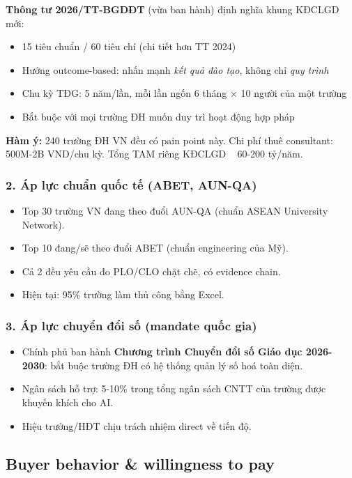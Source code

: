 \documentclass[11pt,a4paper]{article}
\begin{document}
\textbf{Thông tư 2026/TT-BGDĐT} (vừa ban hành) định nghĩa khung KĐCLGD mới:
\begin{itemize}
\item 15 tiêu chuẩn / 60 tiêu chí (chi tiết hơn TT 2024)
\item Hướng outcome-based: nhấn mạnh \textit{kết quả đào tạo}, không chỉ \textit{quy trình}
\item Chu kỳ TĐG: 5 năm/lần, mỗi lần ngốn 6 tháng × 10 người của một trường
\item Bắt buộc với mọi trường ĐH muốn duy trì hoạt động hợp pháp
\end{itemize}

\textbf{Hàm ý:} 240 trường ĐH VN đều có pain point này. Chi phí thuê consultant: 500M-2B VND/chu kỳ. Tổng TAM riêng KĐCLGD ~ 60-200 tỷ/năm.

\subsubsection*{2. Áp lực chuẩn quốc tế (ABET, AUN-QA)}

\begin{itemize}
\item Top 30 trường VN đang theo đuổi AUN-QA (chuẩn ASEAN University Network).
\item Top 10 đang/sẽ theo đuổi ABET (chuẩn engineering của Mỹ).
\item Cả 2 đều yêu cầu đo PLO/CLO chặt chẽ, có evidence chain.
\item Hiện tại: 95\% trường làm thủ công bằng Excel.
\end{itemize}

\subsubsection*{3. Áp lực chuyển đổi số (mandate quốc gia)}

\begin{itemize}
\item Chính phủ ban hành \textbf{Chương trình Chuyển đổi số Giáo dục 2026-2030}: bắt buộc trường ĐH có hệ thống quản lý số hoá toàn diện.
\item Ngân sách hỗ trợ: 5-10\% trong tổng ngân sách CNTT của trường được khuyến khích cho AI.
\item Hiệu trưởng/HĐT chịu trách nhiệm direct về tiến độ.
\end{itemize}

\subsection{Buyer behavior \& willingness to pay}
\end{document}
